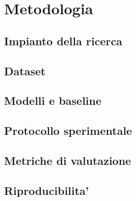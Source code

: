 \chapter{Metodologia}
\label{cap:metodologia}


\section{Impianto della ricerca}
\label{sec:impianto}

\section{Dataset}
\label{sec:dataset}

\section{Modelli e baseline}
\label{sec:modelli-baseline}

\section{Protocollo sperimentale}
\label{sec:protocollo}

\section{Metriche di valutazione}
\label{sec:metriche}

\section{Riproducibilita'}
\label{sec:riproducibilita}
